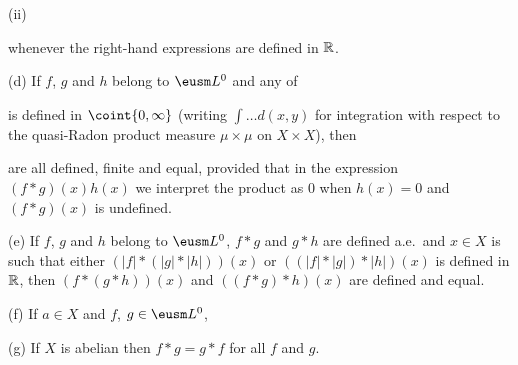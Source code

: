 \quad(ii)




\noindent whenever the right-hand expressions are defined in $\Bbb R$.

(d) If $f$, $g$ and $h$ belong to $\eusm L^0$ and any of



\noindent is defined in $\coint{0,\infty}$ (writing $\int\ldots d(x,y)$ for
integration with respect to the quasi-Radon product measure
$\mu\times\mu$ on $X\times X$), then



\noindent are all defined, finite and equal, provided that in the
expression $(f*g)(x)h(x)$ we interpret the product as $0$ when $h(x)=0$
and $(f*g)(x)$ is undefined.

(e) If $f$, $g$ and $h$ belong to $\eusm L^0$, $f*g$ and $g*h$ are
defined a.e.\ and $x\in X$ is such that either $(|f|*(|g|*|h|))(x)$ or
$((|f|*|g|)*|h|)(x)$ is defined in $\Bbb R$, then $(f*(g*h))(x)$ and
$((f*g)*h)(x)$ are defined and equal.

(f) If $a\in X$ and $f$, $g\in\eusm L^0$,




(g) If $X$ is abelian then $f*g=g*f$ for all $f$ and $g$.

